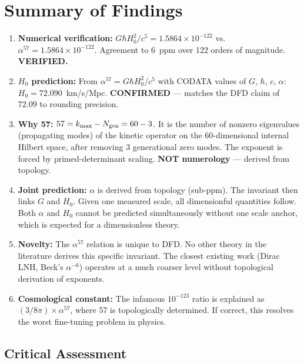 \documentclass[11pt]{article}
\begin{document}
\section{Summary of Findings}
\label{sec:summary}

\begin{enumerate}
\item \textbf{Numerical verification:} $G\hbar H_0^2/c^5 = 1.5864 \times 10^{-122}$
vs.\ $\alpha^{57} = 1.5864 \times 10^{-122}$. Agreement to $6$~ppm over
122 orders of magnitude. \textbf{VERIFIED.}

\item \textbf{$H_0$ prediction:} From $\alpha^{57} = G\hbar H_0^2/c^5$ with
CODATA values of $G$, $\hbar$, $c$, $\alpha$: $H_0 = 72.090$~km/s/Mpc.
\textbf{CONFIRMED} --- matches the DFD claim of 72.09 to rounding precision.

\item \textbf{Why 57:} $57 = k_{\max} - N_{\rm gen} = 60 - 3$. It is the
number of nonzero eigenvalues (propagating modes) of the kinetic operator
on the 60-dimensional internal Hilbert space, after removing 3 generational
zero modes. The exponent is forced by primed-determinant scaling.
\textbf{NOT numerology} --- derived from topology.

\item \textbf{Joint prediction:} $\alpha$ is derived from topology
(sub-ppm). The invariant then links $G$ and $H_0$. Given one measured
scale, all dimensionful quantities follow. Both $\alpha$ and $H_0$ cannot
be predicted simultaneously without one scale anchor, which is expected
for a dimensionless theory.

\item \textbf{Novelty:} The $\alpha^{57}$ relation is unique to DFD.
No other theory in the literature derives this specific invariant. The
closest existing work (Dirac LNH, Beck's $\alpha^{-6}$) operates at a
much coarser level without topological derivation of exponents.

\item \textbf{Cosmological constant:} The infamous $10^{-123}$ ratio is
explained as $(3/8\pi) \times \alpha^{57}$, where 57 is topologically
determined. If correct, this resolves the worst fine-tuning problem in
physics.
\end{enumerate}

\subsection{Critical Assessment}
\end{document}
